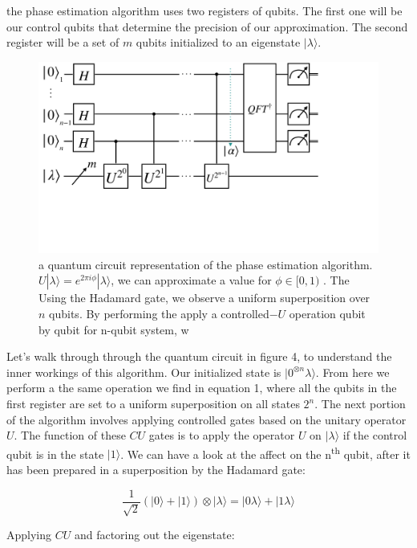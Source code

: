 \documentclass[twocolumn,showpacs,preprintnumbers,amsmath,amssymb]{revtex4}
\begin{document}
	    the phase estimation algorithm uses two registers of qubits. The first one will be our control qubits that determine the precision of our approximation. The second register will be a set of $m$ qubits initialized to an eigenstate $|\lambda\rangle$.
	    
	    
		\begin{figure}[!h]
			\centering
			\includegraphics[trim={1cm 12cm 11cm 0},clip, width=0.99 \linewidth]{"graphics/phase_circ"}
			\caption{a quantum circuit representation of the phase estimation algorithm. $ U |\lambda \rangle = e^{2\pi i \phi} |\lambda \rangle $, we can  approximate a value for $\phi \in [0,1)$ . The  Using the Hadamard gate, we observe a uniform superposition over $n$ qubits. By performing the apply a controlled$-U$ operation qubit by qubit for n-qubit system, w}
			\label{fig:phasrcircuit}
		\end{figure}
		
		
		Let's walk through through the quantum circuit in figure 4, to understand the inner workings of this algorithm.	 Our initialized state is $|0^{\otimes n} \lambda\rangle$. From here we perform a the same operation we find in equation 1, where all the qubits in the first register are set to a uniform superposition on all states $2^n$. The next portion of the algorithm involves applying controlled gates based on the unitary operator $U$. The function of these $CU$ gates is to apply the operator $U$ on $|\lambda\rangle$ if the control qubit is in the state $|1\rangle$. We can have a look at the affect on the n\textsuperscript{th} qubit, after it has been prepared in a superposition by the Hadamard gate:
		
		$$ \frac{1}{\sqrt{2}}(|0\rangle + |1\rangle) \otimes |\lambda\rangle = |0 \lambda \rangle + |1 \lambda\rangle$$
		
		Applying $CU$ and factoring out the eigenstate:
		
\end{document}
